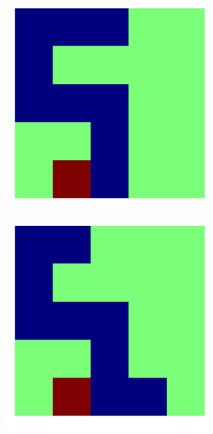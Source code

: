 \documentclass{article}
\begin{document}
\begin{figure}[!htpb]
\begin{subfigure}[b]{.19\linewidth}
    \includegraphics[width=\linewidth]{snake_62.png}
  \end{subfigure}
  \begin{subfigure}[b]{.19\linewidth}
    \includegraphics[width=\linewidth]{snake_63.png}

\end{subfigure}
\end{figure}
\end{document}
